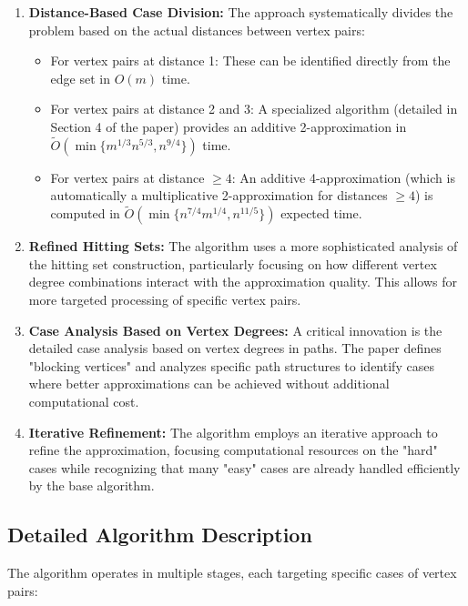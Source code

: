 \documentclass[a4paper,11pt,oneside]{book}
\begin{document}
\begin{enumerate}
    \item \textbf{Distance-Based Case Division:} The approach systematically divides the problem based on the actual distances between vertex pairs:
    \begin{itemize}
        \item For vertex pairs at distance 1: These can be identified directly from the edge set in $O(m)$ time.
        \item For vertex pairs at distance 2 and 3: A specialized algorithm (detailed in Section 4 of the paper) provides an additive 2-approximation in $\tilde{O}(\min\{m^{1/3}n^{5/3}, n^{9/4}\})$ time.
        \item For vertex pairs at distance $\geq 4$: An additive 4-approximation (which is automatically a multiplicative 2-approximation for distances $\geq 4$) is computed in $\tilde{O}(\min\{n^{7/4}m^{1/4}, n^{11/5}\})$ expected time.
    \end{itemize}

    \item \textbf{Refined Hitting Sets:} The algorithm uses a more sophisticated analysis of the hitting set construction, particularly focusing on how different vertex degree combinations interact with the approximation quality. This allows for more targeted processing of specific vertex pairs.
    
    \item \textbf{Case Analysis Based on Vertex Degrees:} A critical innovation is the detailed case analysis based on vertex degrees in paths. The paper defines "blocking vertices" and analyzes specific path structures to identify cases where better approximations can be achieved without additional computational cost.
    
    \item \textbf{Iterative Refinement:} The algorithm employs an iterative approach to refine the approximation, focusing computational resources on the "hard" cases while recognizing that many "easy" cases are already handled efficiently by the base algorithm.
\end{enumerate}

\subsection{Detailed Algorithm Description}

The algorithm operates in multiple stages, each targeting specific cases of vertex pairs:\\
\end{document}
